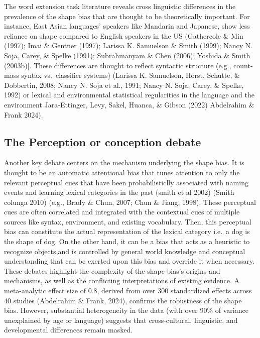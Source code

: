 \documentclass[10pt, letterpaper]{article}
\begin{document}
The word extension task literature reveals cross linguistic differences
in the prevalence of the shape bias that are thought to be theoretically
important. For instance, East Asian languages' speakers like Mandarin
and Japanese, show less reliance on shape compared to English speakers
in the US (Gathercole \& Min (1997); Imai \& Gentner (1997); Larissa K.
Samuelson \& Smith (1999); Nancy N. Soja, Carey, \& Spelke (1991);
Subrahmanyam \& Chen (2006); Yoshida \& Smith (2003b){]}. These
differences are thought to reflect syntactic structure (e.g., count-mass
syntax vs.~classifier systems) (Larissa K. Samuelson, Horst, Schutte, \&
Dobbertin, 2008; Nancy N. Soja et al., 1991; Nancy N. Soja, Carey, \&
Spelke, 1992) or lexical and environmental statistical regularities in
the language and the environment Jara-Ettinger, Levy, Sakel, Huanca, \&
Gibson (2022) Abdelrahim \& Frank 2024).

\hypertarget{the-perception-or-conception-debate}{%
\subsection{The Perception or conception
debate}\label{the-perception-or-conception-debate}}

Another key debate centers on the mechanism underlying the shape bias.
It is thought to be an automatic attentional bias that tunes attention
to only the relevant perceptual cues that have been probabilisticlly
associated with naming events and learning lexical categories in the
past (smith et al 2002) (Smith colunga 2010) (e.g., Brady \& Chun, 2007;
Chun \& Jiang, 1998). These perceptual cues are often correlated and
integrated with the contextual cues of multiple sources like syntax,
environment, and existing vocabulary. Then, this perceptual bias can
constitute the actual representation of the lexical category i.e.~a dog
is the shape of dog. On the other hand, it can be a bias that acts as a
heuristic to recognize objects,and is controlled by general world
knowledge and conceptual understanding that can be exerted upon this
bias and override it when necessary. These debates highlight the
complexity of the shape bias's origins and mechanisms, as well as the
conflicting interpretations of existing evidence. A meta-analytic effect
size of 0.8, derived from over 300 standardized effects across 40
studies (Abdelrahim \& Frank, 2024), confirms the robustness of the
shape bias. However, substantial heterogeneity in the data (with over
90\% of variance unexplained by age or language) suggests that
cross-cultural, linguistic, and developmental differences remain masked.
\end{document}
